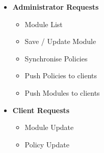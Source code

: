 {\begin{multicols}{2}
				\begin{itemize}[itemsep=1pt,parsep=1pt]
					\item \textbf{Administrator Requests}
						\begin{itemize}
							\item Module List
							\item Save / Update Module
							\item Synchronise Policies
							\item Push Policies to clients 
							\item Push Modules to clients
						\end{itemize}
				
				\columnbreak
						
					\item \textbf{Client Requests}
						\begin{itemize}
							\item Module Update
							\item Policy Update
						\end{itemize}					
				\end{itemize}	
				
			\end{multicols}	
			
}
